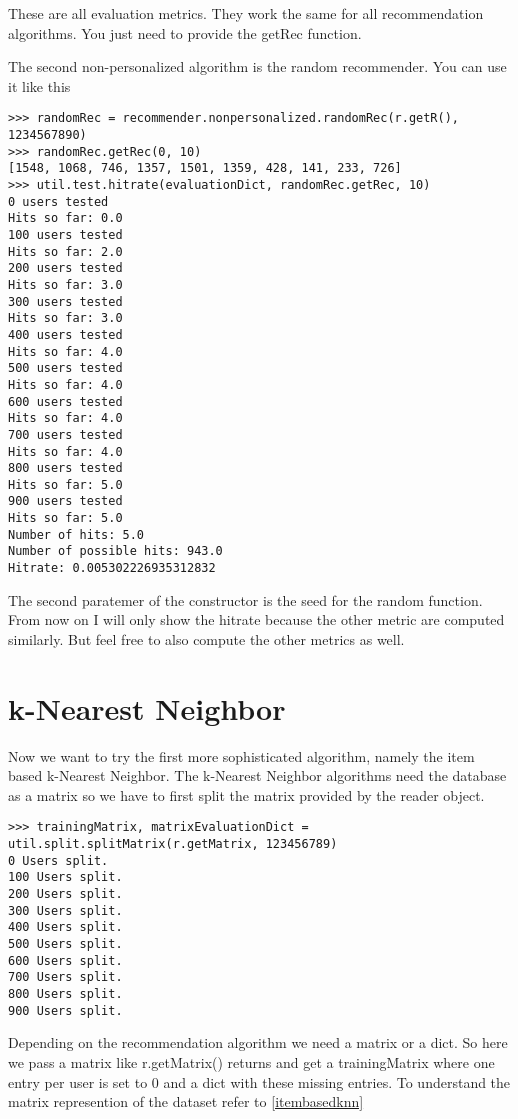 These are all evaluation metrics. They work the same for all 
recommendation algorithms. You just need to provide the getRec function.

The second non-personalized algorithm is the random recommender.
You can use it like this
\begin{lstlisting}
>>> randomRec = recommender.nonpersonalized.randomRec(r.getR(), 1234567890)
>>> randomRec.getRec(0, 10)
[1548, 1068, 746, 1357, 1501, 1359, 428, 141, 233, 726]
>>> util.test.hitrate(evaluationDict, randomRec.getRec, 10)
0 users tested
Hits so far: 0.0
100 users tested
Hits so far: 2.0
200 users tested
Hits so far: 3.0
300 users tested
Hits so far: 3.0
400 users tested
Hits so far: 4.0
500 users tested
Hits so far: 4.0
600 users tested
Hits so far: 4.0
700 users tested
Hits so far: 4.0
800 users tested
Hits so far: 5.0
900 users tested
Hits so far: 5.0
Number of hits: 5.0
Number of possible hits: 943.0
Hitrate: 0.005302226935312832
\end{lstlisting}
The second paratemer of the constructor is the seed for the random function.
From now on I will only show the hitrate because the other metric are computed
similarly. But feel free to also compute the other metrics as well.

\section{k-Nearest Neighbor}
Now we want to try the first more sophisticated algorithm, namely the item based
k-Nearest Neighbor. The k-Nearest Neighbor algorithms need the database as a matrix so we have to
first split the matrix provided by the reader object.
\begin{lstlisting}
>>> trainingMatrix, matrixEvaluationDict = util.split.splitMatrix(r.getMatrix, 123456789)
0 Users split.
100 Users split.
200 Users split.
300 Users split.
400 Users split.
500 Users split.
600 Users split.
700 Users split.
800 Users split.
900 Users split.
\end{lstlisting}
Depending on the recommendation algorithm we need a matrix or a dict.
So here we pass a matrix like r.getMatrix() returns and get a trainingMatrix where one
entry per user is set to 0 and a dict with these missing entries.
To understand the matrix represention of the dataset refer to \ref{itembasedknn}

